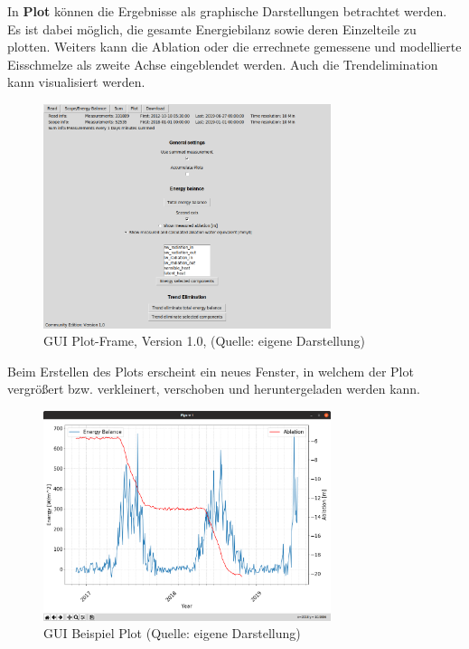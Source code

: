 \documentclass[11pt,a4paper]{article}
\newcommand{\guiplotsize}{0.75}
\newcommand{\guiversion}{1.0}
\begin{document}
In \textbf{Plot} können die Ergebnisse als graphische Darstellungen betrachtet werden. Es ist dabei möglich, die gesamte Energiebilanz sowie deren Einzelteile zu plotten. Weiters kann die Ablation oder die errechnete gemessene und modellierte Eisschmelze als zweite Achse eingeblendet werden. Auch die Trendelimination kann visualisiert werden.

\begin{figure}[H]
\centering
\includegraphics[width=\guiplotsize\textwidth]{pictures/GUI/Plot_Frame.png}
\caption[GUI Plot-Frame, Version \guiversion]{GUI Plot-Frame, Version \guiversion, (Quelle: eigene Darstellung)}
\label{fig:GUI Plot-Frame}
\end{figure}

Beim Erstellen des Plots erscheint ein neues Fenster, in welchem der Plot vergrößert bzw. verkleinert, verschoben und heruntergeladen werden kann.

\begin{figure}[H]
\centering
\includegraphics[width=\guiplotsize\textwidth]{pictures/GUI/Sample_Plot.png}
\caption[GUI Beispiel Plot]{GUI Beispiel Plot (Quelle: eigene Darstellung)}
\label{fig:GUI Beispiel Plot}
\end{figure}
\end{document}
